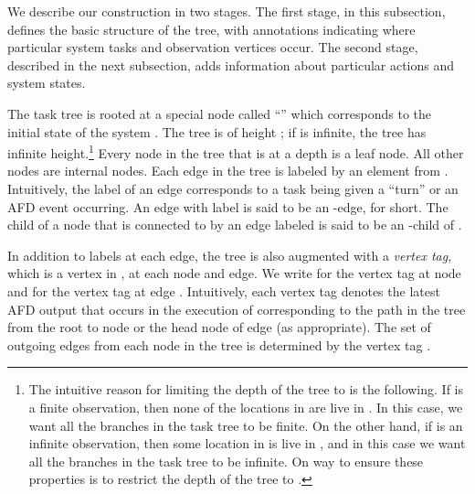 \documentclass[11pt]{article}
\numberwithin{theorem}{section}
\begin{document}
We describe our construction in two stages.
The first stage, in this subsection, defines the basic structure of
the tree, with annotations indicating where particular system tasks and
observation vertices occur.  
The second stage, described in the next subsection, adds information
about particular actions and system states.

The task tree is rooted at a special node called ``'' which
corresponds to the initial state of the system .
The tree is of height ; if  is infinite, the tree has infinite height.\footnote{The intuitive reason for limiting the depth of the tree to  is the following.
If  is a finite observation, then none of the locations in  are live in . In this case, we want all the branches in the task tree to be finite.
	On the other hand, if  is an infinite observation, then some location in  is live in , and in this case we want all the branches in the task tree to be infinite.
	On way to ensure these properties is to restrict the depth of the tree to .} 
Every node  in the tree that is at a depth  is a leaf
node. All other nodes are internal nodes. 
Each edge in the tree is labeled by an element from . 
Intuitively, the label of an edge corresponds to a task being given a
``turn'' or an AFD event occurring. 
An edge with label  is said to be an -edge, for short. 
The child of a node  that is connected to  by an edge labeled
 is said to be an -child of .

In addition to labels at each edge, the tree is also augmented with
a \emph{vertex tag}, which is a vertex in , at each node and edge. 
We write  for the vertex tag at node  and  for the vertex
tag at edge . Intuitively, each vertex tag denotes the latest
AFD output that occurs in the execution of  corresponding to 
the path in the tree from the root to node  or the head node of edge  (as appropriate).
The set of outgoing edges from each node  in the tree is determined by the vertex tag . 
\end{document}
